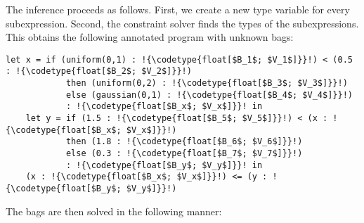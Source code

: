The inference proceeds as follows. First, we create a new type variable for every subexpression. Second, the constraint solver finds the types of the subexpressions.
This obtains the following annotated program with unknown bags:

\begin{lstlisting}[aboveskip=1em,belowskip=1em,escapechar=!]
    let x = if (uniform(0,1) : !{\codetype{float[$B_1$; $V_1$]}}!) < (0.5 : !{\codetype{float[$B_2$; $V_2$]}}!)
            then (uniform(0,2) : !{\codetype{float[$B_3$; $V_3$]}}!)
            else (gaussian(0,1) : !{\codetype{float[$B_4$; $V_4$]}}!)
            : !{\codetype{float[$B_x$; $V_x$]}}! in
    let y = if (1.5 : !{\codetype{float[$B_5$; $V_5$]}}!) < (x : !{\codetype{float[$B_x$; $V_x$]}}!)
            then (1.8 : !{\codetype{float[$B_6$; $V_6$]}}!)
            else (0.3 : !{\codetype{float[$B_7$; $V_7$]}}!)
            : !{\codetype{float[$B_y$; $V_y$]}}! in
    (x : !{\codetype{float[$B_x$; $V_x$]}}!) <= (y : !{\codetype{float[$B_y$; $V_y$]}}!)
\end{lstlisting}

The bags are then solved in the following manner:


